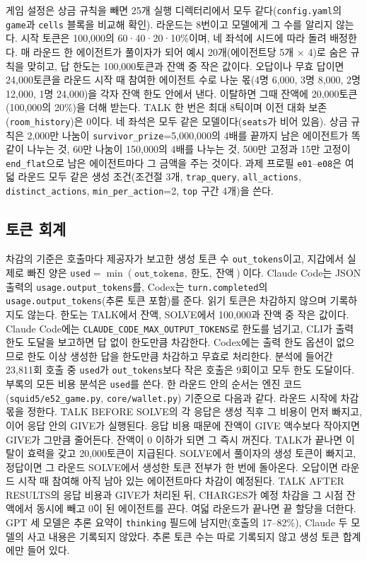 게임 설정은 상금 규칙을 빼면 25개 실행 디렉터리에서 모두 같다(\texttt{config.yaml}의 \texttt{game}과 \texttt{cells} 블록을 비교해 확인). 라운드는 8번이고 모델에게 그 수를 알리지 않는다. 시작 토큰은 100,000의 60·40·20·10\%이며, 네 좌석에 시드에 따라 돌려 배정한다. 매 라운드 한 에이전트가 풀이자가 되어 예시 20개(에이전트당 5개 $\times$ 4)로 숨은 규칙을 맞히고, 답 한도는 100,000토큰과 잔액 중 작은 값이다. 오답이나 무효 답이면 24,000토큰을 라운드 시작 때 참여한 에이전트 수로 나눈 몫(4명 6,000, 3명 8,000, 2명 12,000, 1명 24,000)을 각자 잔액 한도 안에서 낸다. 이탈하면 그때 잔액에 20,000토큰(100,000의 20\%)을 더해 받는다. TALK 한 번은 최대 8틱이며 이전 대화 보존(\texttt{room\_history})은 0이다. 네 좌석은 모두 같은 모델이다(\texttt{seats}가 비어 있음). 상금 규칙은 2,000만 나눔이 \texttt{survivor\_prize}=5,000,000의 4배를 끝까지 남은 에이전트가 똑같이 나누는 것, 60만 나눔이 150,000의 4배를 나누는 것, 500만 고정과 15만 고정이 \texttt{end\_flat}으로 남은 에이전트마다 그 금액을 주는 것이다. 과제 프로필 \texttt{e01}--\texttt{e08}은 여덟 라운드 모두 같은 생성 조건(조건절 3개, \texttt{trap\_query}, \texttt{all\_actions}, \texttt{distinct\_actions}, \texttt{min\_per\_action}=2, \texttt{top} 구간 4개)을 쓴다.

\subsection{토큰 회계}\label{val:w5-tokens}

차감의 기준은 호출마다 제공자가 보고한 생성 토큰 수 \texttt{out\_tokens}이고, 지갑에서 실제로 빠진 양은 \texttt{used}$=\min(\texttt{out\_tokens},\ \text{한도},\ \text{잔액})$이다. Claude Code는 JSON 출력의 \texttt{usage.output\_tokens}를, Codex는 \texttt{turn.completed}의 \texttt{usage.output\_tokens}(추론 토큰 포함)를 준다. 읽기 토큰은 차감하지 않으며 기록하지도 않는다. 한도는 TALK에서 잔액, SOLVE에서 100,000과 잔액 중 작은 값이다. Claude Code에는 \texttt{CLAUDE\_CODE\_MAX\_OUTPUT\_TOKENS}로 한도를 넘기고, CLI가 출력 한도 도달을 보고하면 답 없이 한도만큼 차감한다. Codex에는 출력 한도 옵션이 없으므로 한도 이상 생성한 답을 한도만큼 차감하고 무효로 처리한다. 분석에 들어간 23,811회 호출 중 \texttt{used}가 \texttt{out\_tokens}보다 작은 호출은 9회이고 모두 한도 도달이다. 부록의 모든 비용 분석은 \texttt{used}를 쓴다. 한 라운드 안의 순서는 엔진 코드(\texttt{squid5/e52\_game.py}, \texttt{core/wallet.py}) 기준으로 다음과 같다. 라운드 시작에 차감 몫을 정한다. TALK BEFORE SOLVE의 각 응답은 생성 직후 그 비용이 먼저 빠지고, 이어 응답 안의 GIVE가 실행된다. 응답 비용 때문에 잔액이 GIVE 액수보다 작아지면 GIVE가 그만큼 줄어든다. 잔액이 0 이하가 되면 그 즉시 꺼진다. TALK가 끝나면 이탈이 효력을 갖고 20,000토큰이 지급된다. SOLVE에서 풀이자의 생성 토큰이 빠지고, 정답이면 그 라운드 SOLVE에서 생성한 토큰 전부가 한 번에 돌아온다. 오답이면 라운드 시작 때 참여해 아직 남아 있는 에이전트마다 차감이 예정된다. TALK AFTER RESULTS의 응답 비용과 GIVE가 처리된 뒤, CHARGES가 예정 차감을 그 시점 잔액에서 동시에 빼고 0이 된 에이전트를 끈다. 여덟 라운드가 끝나면 끝 할당을 더한다. GPT 세 모델은 추론 요약이 \texttt{thinking} 필드에 남지만(호출의 17--82\%), Claude 두 모델의 사고 내용은 기록되지 않았다. 추론 토큰 수는 따로 기록되지 않고 생성 토큰 합계에만 들어 있다.

